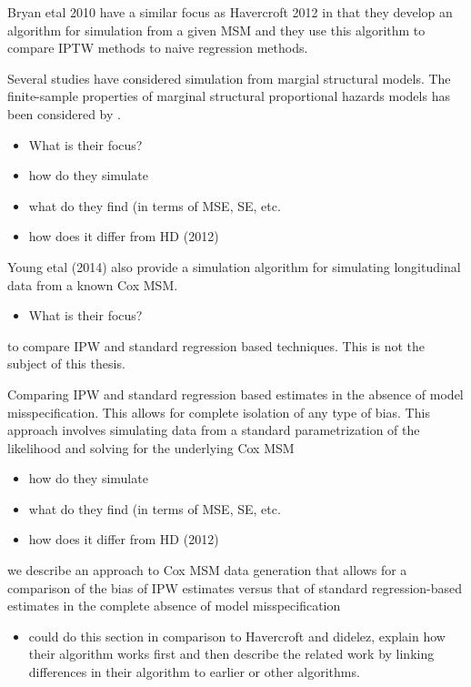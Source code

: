 \documentclass[11pt]{article}
\providecommand{\tightlist}{%
      \setlength{\itemsep}{0pt}\setlength{\parskip}{0pt}}
\begin{document}
Bryan etal 2010 have a similar focus as Havercroft 2012 in that they
develop an algorithm for simulation from a given MSM and they use this
algorithm to compare IPTW methods to naive regression methods.

Several studies have considered simulation from margial structural
models. The finite-sample properties of marginal structural proportional
hazards models has been considered by \citet{Westreich2009}.

\begin{itemize}
\tightlist
\item
  What is their focus?
\item
  how do they simulate
\item
  what do they find (in terms of MSE, SE, etc.
\item
  how does it differ from HD (2012)
\end{itemize}

Young etal (2014) also provide a simulation algorithm for simulating
longitudinal data from a known Cox MSM.

\begin{itemize}
\tightlist
\item
  What is their focus?
\end{itemize}

to compare IPW and standard regression based techniques. This is not the
subject of this thesis.

Comparing IPW and standard regression based estimates in the absence of
model misspecification. This allows for complete isolation of any type
of bias. This approach involves simulating data from a standard
parametrization of the likelihood and solving for the underlying Cox MSM

\begin{itemize}
\item
  how do they simulate
\item
  what do they find (in terms of MSE, SE, etc.
\item
  how does it differ from HD (2012)
\end{itemize}

we describe an approach to Cox MSM data generation that allows for a
comparison of the bias of IPW estimates versus that of standard
regression-based estimates in the complete absence of model
misspecification

\begin{itemize}
\tightlist
\item
  could do this section in comparison to Havercroft and didelez, explain
  how their algorithm works first and then describe the related work by
  linking differences in their algorithm to earlier or other algorithms.
\end{itemize}
\end{document}
